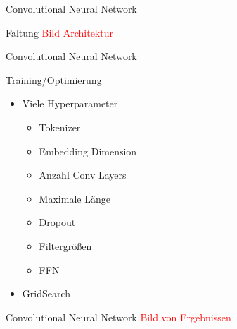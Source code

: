 \documentclass[aspectratio=169]{beamer} %
\begin{document}
\begin{frame}{Convolutional Neural Network}
    \begin{block}{Faltung}
        \textcolor{red}{Bild Architektur}
    \end{block}
\end{frame}

\begin{frame}{Convolutional Neural Network}
    \begin{block}{Training/Optimierung}
        \begin{itemize}
            \item Viele Hyperparameter
            \begin{itemize}
                \item Tokenizer

                \item Embedding Dimension

                \item Anzahl Conv Layers

                \item Maximale L\"ange

                \item Dropout

                \item Filtergr\"o{\ss}en

                \item FFN
            \end{itemize}
            
            \item GridSearch
        \end{itemize}
    \end{block}
\end{frame}

\begin{frame}{Convolutional Neural Network}
    \textcolor{red}{Bild von Ergebnissen}
\end{frame}
\end{document}
